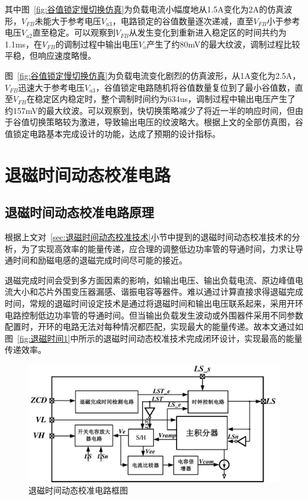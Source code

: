 其中图~\ref{fig:谷值锁定慢切换仿真}为负载电流小幅度地从1.5A变化为2A的仿真波形，$V_{FB}$未能大于参考电压$V_{a3}$，电路锁定的谷值数量逐次递减，直至$V_{FB}$小于参考电压$V_{a2}$直至稳定。可以观察到$V_{FB}$从发生变化到重新进入稳定区的时间共约为1.1ms，在$V_{FB}$的调制过程中输出电压$V_{o}$产生了约80mV的最大纹波，调制过程比较平稳，但响应速度略慢。

图~\ref{fig:谷值锁定慢切换仿真}为负载电流变化剧烈的仿真波形，从1A变化为2.5A，$V_{FB}$迅速大于参考电压$V_{a3}$，谷值锁定电路随机将谷值数量复位到了最小谷值数，直至$V_{FB}$在稳定区内稳定时，整个调制时间约为634us，调制过程中输出电压产生了约157mV的最大纹波。可以观察到，快切换策略减少了将近一半的响应时间，但由于谷值切换策略较为激进，导致输出电压的纹波略大。根据上文的全部仿真图，谷值锁定电路基本完成设计的功能，达成了预期的设计指标。


\section{退磁时间动态校准电路}

\subsection{退磁时间动态校准电路原理}

根据上文对~\ref{sec:退磁时间动态校准技术}小节中提到的退磁时间动态校准技术的分析，为了实现高效率的能量传递，应合理的调整低边功率管的导通时间，力求让导通时间和励磁电感的退磁完成时间尽可能的接近。

退磁完成时间会受到多方面因素的影响，如输出电压、输出负载电流、原边峰值电流大小和芯片外围变压器漏感、谐振电容等器件。难以通过计算直接求得退磁完成时间，常规的退磁时间设定技术是通过将退磁时间和输出电压联系起来，采用开环电路控制低边功率管的导通时间。但当输出负载发生波动或外围器件采用不同参数配置时，开环的电路无法对每种情况都匹配，实现最大的能量传递。故本文通过如图~\ref{fig:退磁时间1}中所示的退磁时间动态校准技术完成闭环设计，实现最高的能量传递效率。

\begin{figure}[htbp] 
    \centering
    \includegraphics[width=0.8\linewidth]{figures/退磁技术框图.pdf}
    \caption{退磁时间动态校准电路框图}
    \label{fig:退磁时间动态校准电路框图}
\end{figure} 

